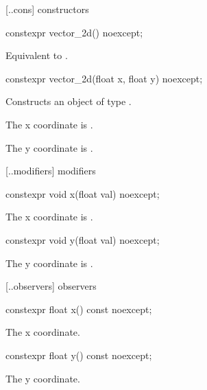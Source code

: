  [\iotwod.\vectortwod.cons] { constructors}

%
\begin{itemdecl}
constexpr vector_2d() noexcept;
\end{itemdecl}
\begin{itemdescr}
\pnum
\effects
Equivalent to .
\end{itemdescr}

%
\begin{itemdecl}
constexpr vector_2d(float x, float y) noexcept;
\end{itemdecl}
\begin{itemdescr}
\pnum
\effects
Constructs an object of type .

\pnum
The x coordinate is .

\pnum
The y coordinate is .
\end{itemdescr}

 [\iotwod.\vectortwod.modifiers]{ modifiers}

%
\begin{itemdecl}
constexpr void x(float val) noexcept;
\end{itemdecl}
\begin{itemdescr}
\pnum
\effects
The x coordinate is .
\end{itemdescr}

%
\begin{itemdecl}
constexpr void y(float val) noexcept;
\end{itemdecl}
\begin{itemdescr}
\pnum
\effects
The y coordinate is .
\end{itemdescr}

 [\iotwod.\vectortwod.observers]{ observers}

%
\begin{itemdecl}
constexpr float x() const noexcept;
\end{itemdecl}
\begin{itemdescr}
\pnum
\returns
The x coordinate.
\end{itemdescr}

%
\begin{itemdecl}
constexpr float y() const noexcept;
\end{itemdecl}
\begin{itemdescr}
\pnum
\returns
The y coordinate.
\end{itemdescr}

